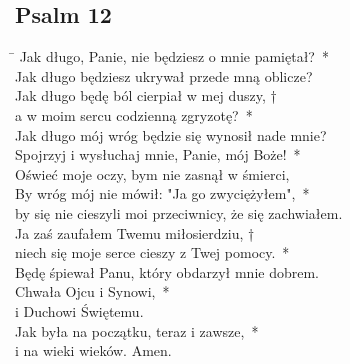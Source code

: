 \subsection*{Psalm 12}
\begin{tabbing}
\hspace{4mm} \= \>\kill
Jak długo, Panie, nie będziesz o mnie pamiętał?~*\\
Jak długo będziesz ukrywał przede mną oblicze?\\
\>Jak długo będę ból cierpiał w mej duszy, †\\
\>a w moim sercu codzienną zgryzotę?~*\\
\>Jak długo mój wróg będzie się wynosił nade mnie?\\
Spojrzyj i wysłuchaj mnie, Panie, mój Boże!~*\\
Oświeć moje oczy, bym nie zasnął w śmierci,\\
\>By wróg mój nie mówił: "Ja go zwyciężyłem",~*\\
\>by się nie cieszyli moi przeciwnicy, że się zachwiałem.\\
Ja zaś zaufałem Twemu miłosierdziu, †\\
niech się moje serce cieszy z Twej pomocy.~*\\
Będę śpiewał Panu, który obdarzył mnie dobrem.\\
\>Chwała Ojcu i Synowi,~*\\
\>i Duchowi Świętemu.\\
Jak była na początku, teraz i zawsze,~*\\
i na wieki wieków. Amen.
\end{tabbing}

